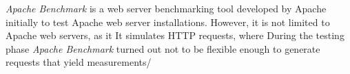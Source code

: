 \emph{Apache Benchmark} is a web server benchmarking tool developed by Apache initially to test Apache web server installations. However, it is not limited to Apache web servers, as it  It simulates HTTP requests, where 
During the testing phase \emph{Apache Benchmark} turned out not to be flexible enough to generate requests that yield measurements/
